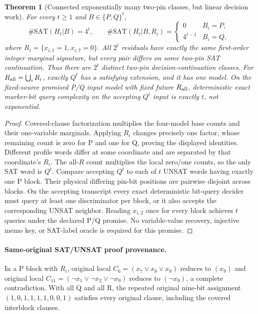 \documentclass[11pt]{article}
\newtheorem{theorem}{Theorem}
\begin{document}
\begin{theorem}[Connected exponentially many two-pin classes, but linear decision work]
For every $t\ge1$ and $B\in\{P,Q\}^t$,
\[
\#\mathrm{SAT}(H_t|B)=4^t,\qquad
\#\mathrm{SAT}(H_t|B,R_i)=
\begin{cases}
0&B_i=P,\\
4^{t-1}&B_i=Q,
\end{cases}
\]
where $R_i=\{x_{i,1}=1,x_{i,7}=0\}$. All $2^t$ residuals have exactly the same first-order integer marginal signature, but every pair differs on some two-pin SAT continuation. Thus there are $2^t$ distinct two-pin decision-continuation classes. For $R_{\rm all}=\bigcup_i R_i$, exactly $Q^t$ has a satisfying extension, and it has one model. On the fixed-source promised P/Q input model with fixed future $R_{\rm all}$, deterministic exact marker-bit query complexity on the accepting $Q^t$ input is exactly $t$, not exponential.
\end{theorem}
\begin{proof}
Covered-clause factorization multiplies the four-model base counts and their one-variable marginals. Applying $R_i$ changes precisely one factor, whose remaining count is zero for P and one for Q, proving the displayed identities. Different profile words differ at some coordinate and are separated by that coordinate's $R_i$. The all-$R$ count multiplies the local zero/one counts, so the only SAT word is $Q^t$. Compare accepting $Q^t$ to each of $t$ UNSAT words having exactly one P block. Their physical differing pin-bit positions are pairwise disjoint across blocks. On the accepting transcript every exact deterministic bit-query decider must query at least one discriminator per block, or it also accepts the corresponding UNSAT neighbor. Reading $x_{i,2}$ once for every block achieves $t$ queries under the declared P/Q promise. No variable-value recovery, injective memo key, or SAT-label oracle is required for this promise.
\end{proof}

\paragraph{Same-original SAT/UNSAT proof provenance.}
In a P block with $R_i$, original local $C_6=(x_7\lor x_8\lor x_9)$ reduces to $(x_9)$ and original local $C_{11}=(\neg x_1\lor\neg x_2\lor\neg x_9)$ reduces to $(\neg x_9)$, a complete contradiction. With all Q and all R, the repeated original nine-bit assignment $(1,0,1,1,1,1,0,0,1)$ satisfies every original clause, including the covered interblock clauses.
\end{document}
